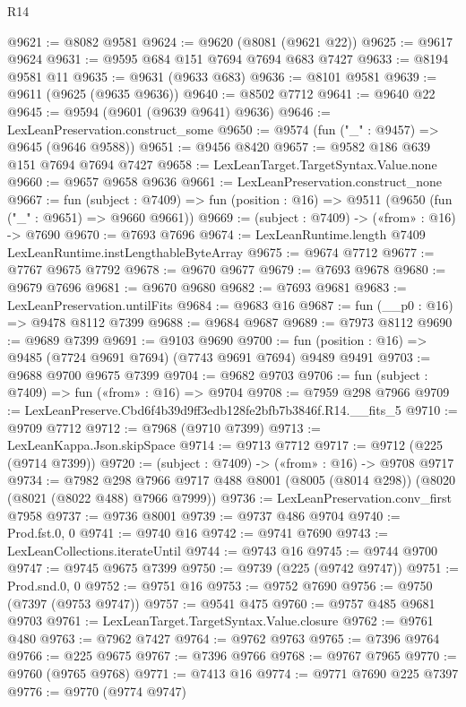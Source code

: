 \begin{lexlean}{R14}
\begin{coremodule}
@9621 := @8082 @9581
@9624 := @9620 (@8081 (@9621 @22))
@9625 := @9617 @9624
@9631 := @9595 @684 @151 @7694 @7694 @683 @7427
@9633 := @8194 @9581 @11
@9635 := @9631 (@9633 @683)
@9636 := @8101 @9581
@9639 := @9611 (@9625 (@9635 @9636))
@9640 := @8502 @7712
@9641 := @9640 @22
@9645 := @9594 (@9601 (@9639 @9641) @9636)
@9646 := LexLeanPreservation.construct_some
@9650 := @9574 (fun ("_" : @9457) => @9645 (@9646 @9588))
@9651 := @9456 @8420
@9657 := @9582 @186 @639 @151 @7694 @7694 @7427
@9658 := LexLeanTarget.TargetSyntax.Value.none
@9660 := @9657 @9658 @9636
@9661 := LexLeanPreservation.construct_none
@9667 := fun (subject : @7409) =>
  fun (position : @16) => @9511 (@9650 (fun ("_" : @9651) => @9660 @9661))
@9669 := (subject : @7409) -> («from» : @16) -> @7690
@9670 := @7693 @7696
@9674 := LexLeanRuntime.length @7409 LexLeanRuntime.instLengthableByteArray
@9675 := @9674 @7712
@9677 := @7767 @9675 @7792
@9678 := @9670 @9677
@9679 := @7693 @9678
@9680 := @9679 @7696
@9681 := @9670 @9680
@9682 := @7693 @9681
@9683 := LexLeanPreservation.untilFits
@9684 := @9683 @16
@9687 := fun (__p0 : @16) => @9478 @8112 @7399
@9688 := @9684 @9687
@9689 := @7973 @8112
@9690 := @9689 @7399
@9691 := @9103 @9690
@9700 := fun (position : @16) => @9485 (@7724 @9691 @7694) (@7743 @9691 @7694) @9489 @9491
@9703 := @9688 @9700 @9675 @7399
@9704 := @9682 @9703
@9706 := fun (subject : @7409) => fun («from» : @16) => @9704
@9708 := @7959 @298 @7966
@9709 := LexLeanPreserve.Cbd6f4b39d9ff3edb128fe2bfb7b3846f.R14.__fits_5
@9710 := @9709 @7712
@9712 := @7968 (@9710 @7399)
@9713 := LexLeanKappa.Json.skipSpace
@9714 := @9713 @7712
@9717 := @9712 (@225 (@9714 @7399))
@9720 := (subject : @7409) -> («from» : @16) -> @9708 @9717
@9734 := @7982
    @298
    @7966
    @9717
    @488
    @8001
    (@8005 (@8014 @298))
    (@8020 (@8021 (@8022 @488) @7966 @7999))
@9736 := LexLeanPreservation.conv_first @7958
@9737 := @9736 @8001
@9739 := @9737 @486 @9704
@9740 := Prod.fst.{0, 0}
@9741 := @9740 @16
@9742 := @9741 @7690
@9743 := LexLeanCollections.iterateUntil
@9744 := @9743 @16
@9745 := @9744 @9700
@9747 := @9745 @9675 @7399
@9750 := @9739 (@225 (@9742 @9747))
@9751 := Prod.snd.{0, 0}
@9752 := @9751 @16
@9753 := @9752 @7690
@9756 := @9750 (@7397 (@9753 @9747))
@9757 := @9541 @475
@9760 := @9757 @485 @9681 @9703
@9761 := LexLeanTarget.TargetSyntax.Value.closure
@9762 := @9761 @480
@9763 := @7962 @7427
@9764 := @9762 @9763
@9765 := @7396 @9764
@9766 := @225 @9675
@9767 := @7396 @9766
@9768 := @9767 @7965
@9770 := @9760 (@9765 @9768)
@9771 := @7413 @16
@9774 := @9771 @7690 @225 @7397
@9776 := @9770 (@9774 @9747)

\end{coremodule}
\end{lexlean}
